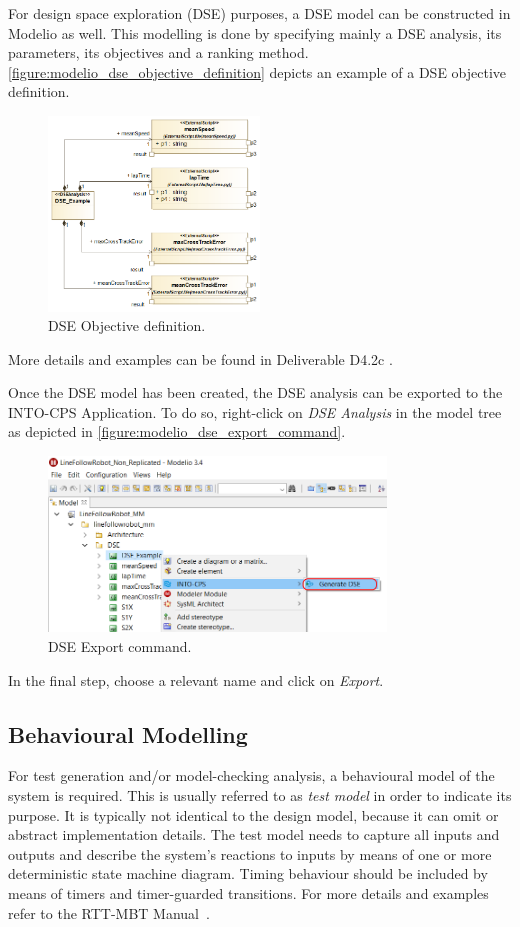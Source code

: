For design space exploration (DSE) purposes, a DSE model can be constructed in Modelio as well. This modelling is done by specifying mainly a DSE analysis, its parameters, its objectives and a ranking method. 
\autoref{figure:modelio_dse_objective_definition} depicts an example of a DSE objective definition.
%
\begin{figure}[hpt!]
	\centerline{\includegraphics[width=0.5\textwidth]{figures/modelio/dse_objective_definition.png}}
	\caption{DSE Objective definition.}
	\label{figure:modelio_dse_objective_definition}
\end{figure}
%
More details and examples can be found in Deliverable D4.2c \cite{INTOCPSD4.2c}.

Once the DSE model has been created, the DSE analysis can be exported to the INTO-CPS Application. To do so, right-click on \emph{DSE Analysis} in the model tree as depicted in \autoref{figure:modelio_dse_export_command}.   
%
\begin{figure}[hpt!]
	\centerline{\includegraphics[width=0.8\textwidth]{figures/modelio/dse_export_command.png}}
	\caption{DSE Export command.}
	\label{figure:modelio_dse_export_command}
\end{figure}
%
In the final step, choose a relevant name and click on \textit{Export}.
%
%
%
\subsection{Behavioural Modelling}\label{sec:SysML:BehaviouralModelling}
For test generation and/or model-checking analysis, a behavioural model of the system is required. This is usually referred to as {\em test model} in order to indicate its purpose. It is typically not identical to the design model, because it can omit or abstract implementation details.
%
The test model needs to capture all inputs and outputs and describe the system's reactions to inputs by means of one or more deterministic state machine diagram. Timing behaviour should be included by means of timers and timer-guarded transitions.
%
For more details and examples refer to the RTT-MBT Manual~\cite{VSI-mbt-man}.

